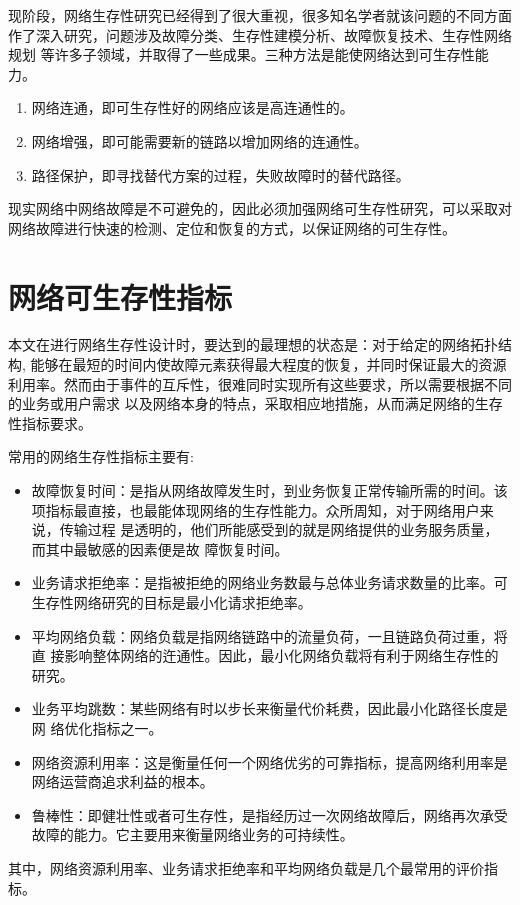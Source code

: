 现阶段，网络生存性研究已经得到了很大重视，很多知名学者就该问题的不同方面作了深入研究，问题涉及故障分类、生存性建模分析、故障恢复技术、生存性网络规划 等许多子领域，并取得了一些成果。三种方法是能使网络达到可生存性能力。
\begin{enumerate}
\item 网络连通，即可生存性好的网络应该是高连通性的。
\item 网络增强，即可能需要新的链路以增加网络的连通性。
\item 路径保护，即寻找替代方案的过程，失败故障时的替代路径。
\end{enumerate}


现实网络中网络故障是不可避免的，因此必须加强网络可生存性研究，可以采取对网络故障进行快速的检测、定位和恢复的方式，以保证网络的可生存性。

\section{网络可生存性指标}
本文在进行网络生存性设计时，要达到的最理想的状态是：对于给定的网络拓扑结构, 能够在最短的时间内使故障元素获得最大程度的恢复，并同时保证最大的资源利用率。然而由于事件的互斥性，很难同时实现所有这些要求，所以需要根据不同的业务或用户需求 以及网络本身的特点，采取相应地措施，从而满足网络的生存性指标要求。

常用的网络生存性指标主要有:
\begin{itemize}
  \item 故障恢复时间：是指从网络故障发生时，到业务恢复正常传输所需的时间。该 项指标最直接，也最能体现网络的生存性能力。众所周知，对于网络用户来说，传输过程 是透明的，他们所能感受到的就是网络提供的业务服务质量，而其中最敏感的因素便是故 障恢复时间。
  \item 业务请求拒绝率：是指被拒绝的网络业务数最与总体业务请求数量的比率。可生存性网络研究的目标是最小化请求拒绝率。
  \item 平均网络负载：网络负载是指网络链路中的流量负荷，一且链路负荷过重，将直 接影响整体网络的迕通性。因此，最小化网络负载将有利于网络生存性的研究。
  \item 业务平均跳数：某些网络有时以步长来衡量代价耗费，因此最小化路径长度是网 络优化指标之一。
  \item 网络资源利用率：这是衡量任何一个网络优劣的可靠指标，提高网络利用率是网络运营商追求利益的根本。
  \item 鲁棒性：即健壮性或者可生存性，是指经历过一次网络故障后，网络再次承受故障的能力。它主要用来衡量网络业务的可持续性。
\end{itemize}
其中，网络资源利用率、业务请求拒绝率和平均网络负载是几个最常用的评价指标。


